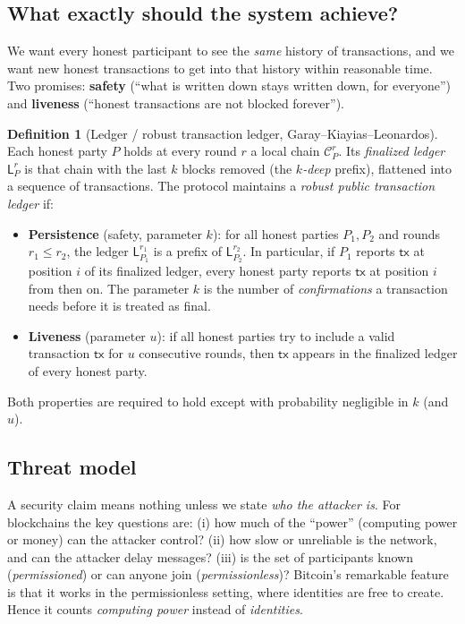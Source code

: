 \documentclass[11pt,a4paper]{article}
\newenvironment{plainenglish}{\par\smallskip}{\par\smallskip}
\newenvironment{formal}{\par\smallskip}{\par\smallskip}
\theoremstyle{definition}
\newtheorem{definition}{Definition}[section]
\theoremstyle{plain}
\theoremstyle{remark}
\begin{document}
\subsection{What exactly should the system achieve?}

\begin{plainenglish}
We want every honest participant to see the \emph{same} history of transactions, and we want new honest
transactions to get into that history within reasonable time. Two promises: \textbf{safety} (``what is
written down stays written down, for everyone'') and \textbf{liveness} (``honest transactions are not
blocked forever'').
\end{plainenglish}

\begin{formal}
\begin{definition}[Ledger / robust transaction ledger, Garay--Kiayias--Leonardos]\label{def:ledger}
Each honest party $P$ holds at every round $r$ a local chain $\mathcal C_P^r$. Its \emph{finalized ledger} $\mathsf{L}_P^r$ is that chain with the last $k$ blocks removed (the \emph{$k$-deep} prefix), flattened into a sequence of transactions. The protocol maintains a \emph{robust public transaction ledger} if:
\begin{itemize}[nosep]
\item \textbf{Persistence} (safety, parameter $k$): for all honest parties $P_1,P_2$ and rounds $r_1\le r_2$, the ledger $\mathsf{L}_{P_1}^{r_1}$ is a prefix of $\mathsf{L}_{P_2}^{r_2}$. In particular, if $P_1$ reports $\mathsf{tx}$ at position $i$ of its finalized ledger, every honest party reports $\mathsf{tx}$ at position $i$ from then on. The parameter $k$ is the number of \emph{confirmations} a transaction needs before it is treated as final.
\item \textbf{Liveness} (parameter $u$): if all honest parties try to include a valid transaction
$\mathsf{tx}$ for $u$ consecutive rounds, then $\mathsf{tx}$ appears in the finalized ledger of every
honest party.
\end{itemize}
Both properties are required to hold except with probability negligible in $k$ (and $u$).
\end{definition}
\end{formal}

\subsection{Threat model}

\begin{plainenglish}
A security claim means nothing unless we state \emph{who the attacker is}. For blockchains the key
questions are: (i) how much of the ``power'' (computing power or money) can the attacker control?
(ii) how slow or unreliable is the network, and can the attacker delay messages?
(iii) is the set of participants known (\emph{permissioned}) or can anyone join (\emph{permissionless})?
Bitcoin's remarkable feature is that it works in the permissionless setting, where identities are
free to create. Hence it counts \emph{computing power} instead of \emph{identities}.
\end{plainenglish}
\end{document}
